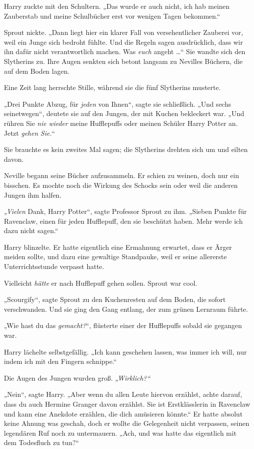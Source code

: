 {Harry zuckte mit den Schultern. „Das wurde er auch nicht, ich hab meinen Zauberstab und meine Schulbücher erst vor wenigen Tagen bekommen.“

Sprout nickte. „Dann liegt hier ein klarer Fall von versehentlicher Zauberei vor, weil ein Junge sich bedroht fühlte. Und die Regeln sagen ausdrücklich, dass wir ihn dafür nicht verantwortlich machen. Was \emph{euch} angeht …“ Sie wandte sich den Slytherins zu. Ihre Augen senkten sich betont langsam zu Nevilles Büchern, die auf dem Boden lagen.

Eine Zeit lang herrschte Stille, während sie die fünf Slytherins musterte.

„Drei Punkte Abzug, für \emph{jeden} von Ihnen“, sagte sie schließlich. „Und sechs seinetwegen“, deutete sie auf den Jungen, der mit Kuchen bekleckert war. „Und rühren Sie \emph{nie wieder} meine Hufflepuffs oder meinen Schüler Harry Potter an. Jetzt \emph{gehen Sie.}“

Sie brauchte es kein zweites Mal sagen; die Slytherins drehten sich um und eilten davon.

Neville begann seine Bücher aufzusammeln. Er schien zu weinen, doch nur ein bisschen. Es mochte noch die Wirkung des Schocks sein oder weil die anderen Jungen ihm halfen.

\emph{„Vielen} Dank, Harry Potter“, sagte Professor Sprout zu ihm. „Sieben Punkte für Ravenclaw, einen für jeden Hufflepuff, den sie beschützt haben. Mehr werde ich dazu nicht sagen.“

Harry blinzelte. Er hatte eigentlich eine Ermahnung erwartet, dass er Ärger meiden sollte, und dazu eine gewaltige Standpauke, weil er seine allererste Unterrichtsstunde verpasst hatte.

Vielleicht \emph{hätte} er nach Hufflepuff gehen sollen. Sprout war cool.

„Scourgify“, sagte Sprout zu den Kuchenresten auf dem Boden, die sofort verschwanden. Und sie ging den Gang entlang, der zum grünen Lernraum führte.

„Wie hast du das \emph{gemacht?}“, flüsterte einer der Hufflepuffs sobald sie gegangen war.

Harry lächelte selbstgefällig. „Ich kann geschehen lassen, was immer ich will, nur indem ich mit den Fingern schnippe.“

Die Augen des Jungen wurden groß. \emph{„Wirklich?“}

„Nein“, sagte Harry. „Aber wenn du allen Leute hiervon erzählst, achte darauf, dass du auch Hermine Granger davon erzählst. Sie ist Erstklässlerin in Ravenclaw und kann eine Anekdote erzählen, die dich amüsieren könnte.“ Er hatte absolut keine Ahnung was geschah, doch er wollte die Gelegenheit nicht verpassen, seinen legendären Ruf noch zu untermauern. „Ach, und was hatte das eigentlich mit dem Todesfluch zu tun?“

}
